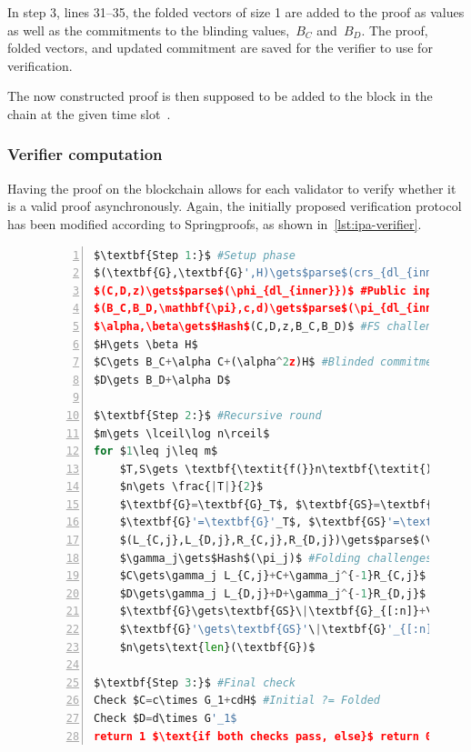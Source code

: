 In step 3, lines 31--35, the folded vectors of size 1 are added to the proof as values as well as the commitments to the blinding values,~$B_C$ and~$B_D$.
The proof, folded vectors, and updated commitment are saved for the verifier to use for verification.


The now constructed proof is then supposed to be added to the block in the chain at the given time slot~\cite{Whisk2024}.

\subsubsection*{Verifier computation}
Having the proof on the blockchain allows for each validator to verify whether it is a valid proof asynchronously.
Again, the initially proposed verification protocol has been modified according to Springproofs, as shown in~\autoref{lst:ipa-verifier}.

\begin{figure}[!htb]
\begin{lstlisting}[language=Python,mathescape=true,label={lst:ipa-verifier},numbers=left,caption={Verifier computation for CAAU-IPA in CAAUrdleproofs},captionpos=b,frame=single]
$\textbf{Step 1:}$ #Setup phase
$(\textbf{G},\textbf{G}',H)\gets$parse$(crs_{dl_{inner}})$
$(C,D,z)\gets$parse$(\phi_{dl_{inner}})$ #Public input
$(B_C,B_D,\mathbf{\pi},c,d)\gets$parse$(\pi_{dl_{inner}})$ #From prover
$\alpha,\beta\gets$Hash$(C,D,z,B_C,B_D)$ #FS challenges
$H\gets \beta H$
$C\gets B_C+\alpha C+(\alpha^2z)H$ #Blinded commitments
$D\gets B_D+\alpha D$

$\textbf{Step 2:}$ #Recursive round
$m\gets \lceil\log n\rceil$
for $1\leq j\leq m$
    $T,S\gets \textbf{\textit{f(}}n\textbf{\textit{)}}$ #Scheme function
    $n\gets \frac{|T|}{2}$
    $\textbf{G}=\textbf{G}_T$, $\textbf{GS}=\textbf{G}_S$ #Vector splitting
    $\textbf{G}'=\textbf{G}'_T$, $\textbf{GS}'=\textbf{G}'_T$
    $(L_{C,j},L_{D,j},R_{C,j},R_{D,j})\gets$parse$(\pi_j)$ #Proof elem
    $\gamma_j\gets$Hash$(\pi_j)$ #Folding challenges
    $C\gets\gamma_j L_{C,j}+C+\gamma_j^{-1}R_{C,j}$ #Update comms
    $D\gets\gamma_j L_{D,j}+D+\gamma_j^{-1}R_{D,j}$
    $\textbf{G}\gets\textbf{GS}\|\textbf{G}_{[:n]}+\gamma_j\textbf{G}_{[n:]}$ #Next round vectors
    $\textbf{G}'\gets\textbf{GS}'\|\textbf{G}'_{[:n]}+\gamma_j^{-1}\textbf{G}'_{[n:]}$
    $n\gets\text{len}(\textbf{G})$

$\textbf{Step 3:}$ #Final check
Check $C=c\times G_1+cdH$ #Initial ?= Folded
Check $D=d\times G'_1$
return 1 $\text{if both checks pass, else}$ return 0
\end{lstlisting}
\label{fig:ipa-verifier}
\end{figure}


